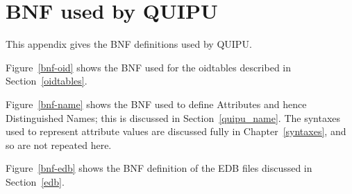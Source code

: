 
\chapter{BNF used by QUIPU}\label{bnf}

This appendix gives the BNF definitions used by QUIPU.

Figure~\ref{bnf-oid} shows the BNF used for the oidtables described in
Section~\ref{oidtables}.

Figure~\ref{bnf-name} shows the BNF used to define Attributes and hence
Distinguished Names; this is discussed in Section~\ref{quipu_name}.
The syntaxes used to represent attribute values are discussed fully in
Chapter~\ref{syntaxes}, and so are not repeated here.


Figure~\ref{bnf-edb} shows the BNF definition of the EDB files
discussed in Section~\ref{edb}.

\clearpage
{}
\clearpage
{}
\clearpage
{}
